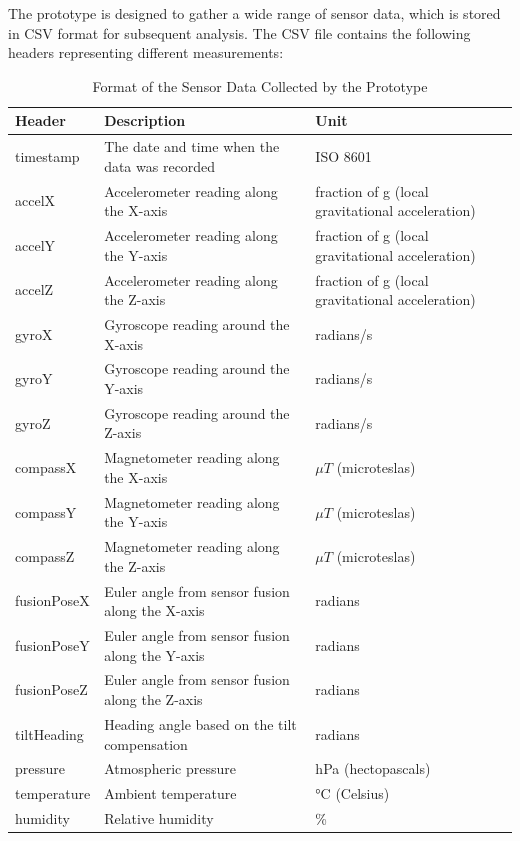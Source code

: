 \documentclass[../main.tex]{subfiles}
\begin{document}
    The prototype is designed to gather a wide range of sensor data, which is stored in CSV format for subsequent analysis. The CSV file contains the following headers representing different measurements:

    \begin{table}[htbp]
        \centering
        \caption{Format of the Sensor Data Collected by the Prototype}
        \label{tab:PrototypeSensorData}
        \begin{tabular}{|l|l|l|} \hline
            \textbf{Header} & \textbf{Description} & \textbf{Unit} \\ \hline
            timestamp & The date and time when the data was recorded & ISO 8601 \\ \hline
            accelX & Accelerometer reading along the X-axis & fraction of g (local gravitational acceleration) \\ \hline
            accelY & Accelerometer reading along the Y-axis & fraction of g (local gravitational acceleration) \\ \hline
            accelZ & Accelerometer reading along the Z-axis & fraction of g (local gravitational acceleration) \\ \hline
            gyroX & Gyroscope reading around the X-axis & radians/s \\ \hline
            gyroY & Gyroscope reading around the Y-axis & radians/s \\ \hline
            gyroZ & Gyroscope reading around the Z-axis & radians/s \\ \hline
            compassX & Magnetometer reading along the X-axis & $\mu T$ (microteslas) \\ \hline
            compassY & Magnetometer reading along the Y-axis & $\mu T$ (microteslas) \\ \hline
            compassZ & Magnetometer reading along the Z-axis & $\mu T$ (microteslas) \\ \hline
            fusionPoseX & Euler angle from sensor fusion along the X-axis & radians \\ \hline
            fusionPoseY & Euler angle from sensor fusion along the Y-axis & radians \\ \hline
            fusionPoseZ & Euler angle from sensor fusion along the Z-axis & radians \\ \hline
            tiltHeading & Heading angle based on the tilt compensation & radians \\ \hline
            pressure & Atmospheric pressure & hPa (hectopascals) \\ \hline
            temperature & Ambient temperature & °C (Celsius) \\ \hline
            humidity & Relative humidity & \% \\ \hline
        \end{tabular}
    \end{table}
    
\end{document}
